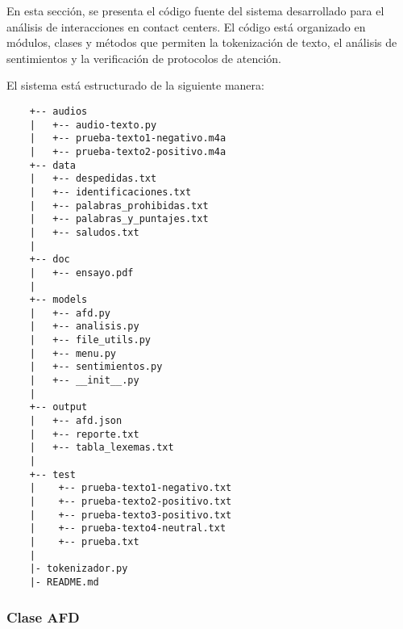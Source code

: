 \documentclass[12pt,a4paper]{scrartcl} %
\begin{document}
En esta sección, se presenta el código fuente del sistema desarrollado para el análisis de
interacciones en contact centers. El código está organizado en módulos, clases y métodos que
permiten la tokenización de texto, el análisis de sentimientos y la verificación de protocolos
de atención.

El sistema está estructurado de la siguiente manera:
\begin{tcolorbox}[colback=gray!10, colframe=gray!80, sharp corners, boxrule=0.5pt]
	\begin{verbatim}
    +-- audios
    |   +-- audio-texto.py
    |   +-- prueba-texto1-negativo.m4a
    |   +-- prueba-texto2-positivo.m4a
    +-- data
    |   +-- despedidas.txt
    |   +-- identificaciones.txt
    |   +-- palabras_prohibidas.txt
    |   +-- palabras_y_puntajes.txt
    |   +-- saludos.txt
    |
    +-- doc
    |   +-- ensayo.pdf
    |
    +-- models
    |   +-- afd.py
    |   +-- analisis.py
    |   +-- file_utils.py
    |   +-- menu.py
    |   +-- sentimientos.py
    |   +-- __init__.py
    |
    +-- output
    |   +-- afd.json
    |   +-- reporte.txt
    |   +-- tabla_lexemas.txt
    |
    +-- test
    |    +-- prueba-texto1-negativo.txt
    |    +-- prueba-texto2-positivo.txt
    |    +-- prueba-texto3-positivo.txt
    |    +-- prueba-texto4-neutral.txt
    |    +-- prueba.txt
    |
    |- tokenizador.py
    |- README.md

\end{verbatim}
\end{tcolorbox}
\newpage
\subsubsection{Clase AFD}
\end{document}
